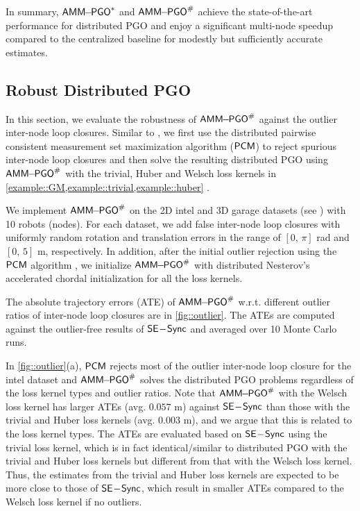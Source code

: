 In summary, $\mathsf{AMM\!\!-\!\!PGO}^*$ and $\mathsf{AMM\!\!-\!\!PGO}^{\#}$ achieve the state-of-the-art performance for distributed PGO and enjoy a significant multi-node speedup compared to the centralized baseline \cite{rosen2016se} for modestly but sufficiently accurate estimates.

\subsection{Robust Distributed PGO} 

In this section, we evaluate the robustness of $\mathsf{AMM\!\!-\!\!PGO}^{\#}$ against the outlier inter-node loop closures. Similar to \cite{chang2020kimera,lajoie2020door}, we first use the distributed pairwise consistent measurement set maximization algorithm ($\mathsf{PCM}$) \cite{mangelson2018pairwise} to reject spurious inter-node loop closures and then solve the resulting distributed PGO using $\mathsf{AMM\!\!-\!\!PGO}^{\#}$ with the trivial, Huber  and Welsch loss kernels in \cref{example::GM,example::trivial,example::huber} . 

We implement $\mathsf{AMM\!\!-\!\!PGO}^{\#}$ on the 2D {\sf intel} and 3D {\sf garage} datasets (see \datasetinfo) with 10 robots (nodes). For each dataset, we add false inter-node loop closures with uniformly random rotation and translation errors in the range of $[0,\,\pi]$ rad and $[0,\,5]$ m, respectively. In addition, after the initial outlier rejection using the $\mathsf{PCM}$ algorithm \cite{mangelson2018pairwise}, we initialize $\mathsf{AMM\!\!-\!\!PGO}^{\#}$ with distributed Nesterov's accelerated chordal initialization \cite{fan2020mm} for all the loss kernels. 


The absolute trajectory errors (ATE)  of $\mathsf{AMM\!\!-\!\!PGO}^{\#}$ w.r.t. different {\highlight outlier ratios} of inter-node loop closures are  in \cref{fig::outlier}. The ATEs are computed against the outlier-free results of $\mathsf{SE\!-\!Sync}$ \cite{rosen2016se}  and  averaged over 10 Monte Carlo runs. 



In \cref{fig::outlier}(a), $\mathsf{PCM}$ \cite{mangelson2018pairwise} rejects most of the outlier inter-node loop closure for the {\sf intel} dataset and $\mathsf{AMM\!\!-\!\!PGO}^{\#}$ solves the distributed PGO problems regardless of the loss kernel types and {\highlight outlier ratios}. Note that $\mathsf{AMM\!\!-\!\!PGO}^{\#}$ with the Welsch loss kernel has larger ATEs (avg. $0.057$ m) against $\mathsf{SE\!-\!Sync}$ \cite{rosen2016se} than those with the trivial and Huber loss kernels (avg. $0.003$ m), and we argue that this is related to the loss kernel types. The ATEs are evaluated based on $\mathsf{SE\!-\!Sync}$ using the trivial loss kernel, which is in fact identical/similar to distributed PGO with the trivial and Huber loss kernels but different from that with the Welsch loss kernel. Thus, the estimates from the trivial and Huber loss kernels are expected to be more close to those of $\mathsf{SE\!-\!Sync}$, which result in smaller ATEs compared to the Welsch loss kernel  if no outliers.

